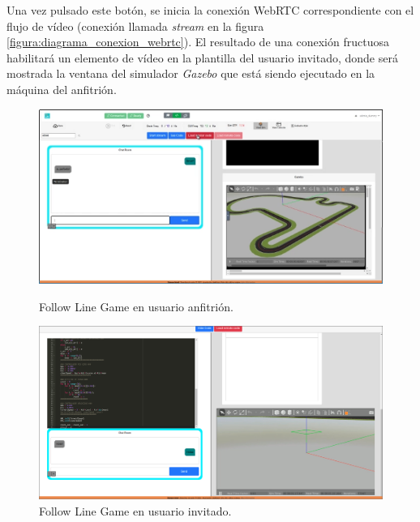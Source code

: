 \documentclass[a4paper, 12pt]{book}
\begin{document}

Una vez pulsado este botón, se inicia la conexión WebRTC correspondiente con el flujo de vídeo (conexión llamada \emph{stream} en la figura \ref{figura:diagrama_conexion_webrtc}). El resultado de una conexión fructuosa habilitará un elemento de vídeo en la plantilla del usuario invitado, donde será mostrada la ventana del simulador \emph{Gazebo} que está siendo ejecutado en la máquina del anfitrión.

\begin{figure}[H]
  \centering
  \begin{minipage}[b]{0.9\textwidth}
    \includegraphics[width=\textwidth]{img/host_gazebo.png}
    \caption{Follow Line Game en usuario anfitrión.}
    \label{figura:robot_davinci}
  \end{minipage}
  \hfill
  \begin{minipage}[b]{0.9\textwidth}
    \includegraphics[width=\textwidth]{img/inv_gazebo.png}
    \caption{Follow Line Game en usuario invitado.}
    \label{figura:robot_atrias}
  \end{minipage}
\end{figure}
\end{document}
